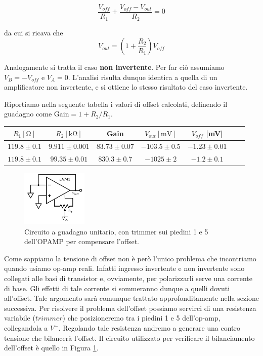 $$\frac{V_{off}}{R_1} + \frac{V_{off}-V_{out}}{R_2} = 0$$

da cui si ricava che
$$V_{out}=\left(1+\frac{R_2}{R_1}\right) V_{off}$$

Analogamente si tratta il caso \textbf{non invertente}. Per far ciò assumiamo $V_B=-V_{off}$ e $V_A=0$. L'analisi risulta dunque identica a quella di un amplificatore non invertente, e si ottiene lo stesso risultato del caso invertente. 


Riportiamo nella seguente tabella i valori di offset calcolati, definendo il guadagno come Gain$=1+R_2/R_1$. 

\begin{center}
\begin{savenotes}
\begin{tabular}{c|c|c|c|c|c|c}
$R_1[\si{\ohm}]$ & $R_2[\si{\kilo\ohm}]$ & Gain &$V_{out} [\si{\milli\volt}]$ & $V_{off}$ [\si{\milli\volt}]\\ 
\hline 
$119.8\pm0.1$ & $9.911\pm0.001$ & $83.73\pm0.07$&  $-103.5 \pm 0.5$ & $-1.23 \pm0.01$\\
\hline
$119.8\pm0.1$ & $99.35\pm0.01$ & $830.3\pm0.7$ &$ -1025 \pm 2$ & $-1.2 \pm0.1$\\

\end{tabular}
\end{savenotes}
\end{center}

\begin{figure}
  \begin{center}
    \includegraphics[width=0.280\textwidth]{../E02/latex/trimmer_correction.pdf}
  \end{center}
  \caption{Circuito a guadagno unitario, con trimmer sui piedini 1 e 5 dell'OPAMP per compensare l'offset.}
  \label{cir2:trimmer}
\end{figure}

Come sappiamo la tensione di offset non è però l'unico problema che incontriamo quando usiamo op-amp reali. Infatti ingresso invertente e non invertente sono collegati alle basi di transistor e, ovviamente, per polarizzarli serve una corrente di base. Gli effetti di tale corrente si sommeranno dunque a quelli dovuti all'offset. Tale argomento sarà comunque trattato approfonditamente nella sezione successiva. Per risolvere il problema dell'offset possiamo servirci di una resistenza variabile ($trimmer$) che posizioneremo tra i piedini 1 e 5 dell'op-amp, collegandola a $V^-$. Regolando tale resistenza andremo a generare una contro tensione che bilancerà l'offset. Il circuito utilizzato per verificare il bilanciamento dell'offset è quello in Figura \ref{cir2:trimmer}.

